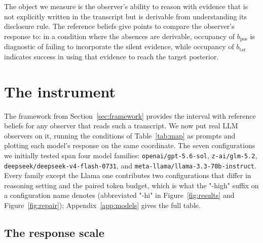 \documentclass{article}
\theoremstyle{plain}
\theoremstyle{definition}
\theoremstyle{remark}
\newcommand{\bpos}{b_{\mathrm{pos}}}
\newcommand{\btar}{b_{\mathrm{tar}}}         %
\begin{document}
The object we measure is the observer's ability to reason
with evidence that is not explicitly written in the transcript but is derivable 
from understanding its disclosure rule. The reference beliefs give points to compare
the observer's response to: in a condition where the absences are 
derivable, occupancy of $\bpos$ is diagnostic of failing to incorporate the silent
evidence, while occupancy of $\btar$ indicates success in using that evidence to reach
the target posterior.





\section{The instrument}\label{sec:instrument}

The framework from Section~\ref{sec:framework} provides the interval with
reference beliefs for any
observer that reads such a transcript. We now put real LLM observers on it,
running the conditions of Table~\ref{tab:map} as prompts and plotting each
model's response on the same coordinate.
The seven configurations we initially tested span four model families: 
\texttt{openai/gpt-5.6-sol},
\texttt{z-ai/glm-5.2}, \texttt{deepseek/deepseek-v4-flash-0731}, and
\texttt{meta-llama/llama-3.3-70b-instruct}. Every family except the Llama one
contributes two configurations that differ in reasoning setting and the paired
token budget, which is what the "-high" suffix on a configuration name denotes
(abbreviated "-hi" in Figure~\ref{fig:results} and Figure~\ref{fig:repair}); Appendix~\ref{app:models}
gives the full table.

\subsection{The response scale}
\end{document}
